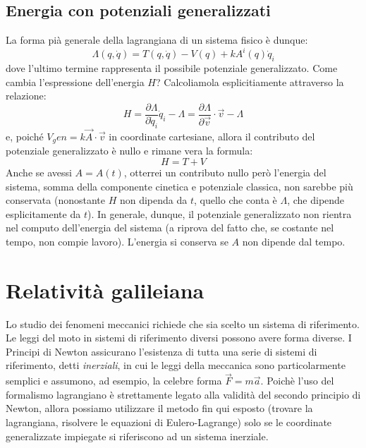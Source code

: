 \documentclass[a4paper,openany]{article}
\begin{document}
	\subsection{Energia con potenziali generalizzati}
	La forma pià generale della lagrangiana di un sistema fisico è dunque:
	\begin{equation}
		\Lambda(q,\dot{q}) = T(q,\dot{q}) - V(q) + kA^{i}(q)\dot{q}_i
	\end{equation}
	dove l'ultimo termine rappresenta il possibile potenziale generalizzato. Come cambia l'espressione dell'energia $H$? Calcoliamola esplicitiamente attraverso la relazione:
	\begin{equation}
		H = \dfrac{\partial \Lambda}{\partial \dot{q}_i}\dot{q}_i - \Lambda = \dfrac{\partial \Lambda}{\partial \vec{v}}\cdot \vec{v} - \Lambda
	\end{equation}
	e, poiché $V_gen = k\vec{A}\cdot\vec{v}$ in coordinate cartesiane, allora il contributo del potenziale generalizzato è nullo e rimane vera la formula:
	$$
	H = T + V
	$$
	Anche se avessi $A = A(t)$, otterrei un contributo nullo però l'energia del sistema, somma della componente cinetica e potenziale classica, non sarebbe più conservata (nonostante $H$ non dipenda da $t$, quello che conta è $\Lambda$, che dipende esplicitamente da $t$). 
	In generale, dunque, il potenziale generalizzato non rientra nel computo dell'energia del sistema (a riprova del fatto che, se costante nel tempo, non compie lavoro). L'energia si conserva se $A$ non dipende dal tempo.
	\newpage
	\section{Relatività galileiana}
	Lo studio dei fenomeni meccanici richiede che sia scelto un sistema di riferimento. Le leggi del moto in sistemi di riferimento diversi possono avere forma diverse. I Principi di Newton assicurano l'esistenza di tutta una serie di sistemi di riferimento, detti \textit{inerziali}, in cui le leggi della meccanica sono particolarmente semplici e assumono, ad esempio, la celebre forma $\vec{F} = m\vec{a}$. Poichè l'uso del formalismo lagrangiano è strettamente legato alla validità del secondo principio di Newton, allora possiamo utilizzare il metodo fin qui esposto (trovare la lagrangiana, risolvere le equazioni di Eulero-Lagrange) solo se le coordinate generalizzate impiegate si riferiscono ad un sistema inerziale.
\end{document}
